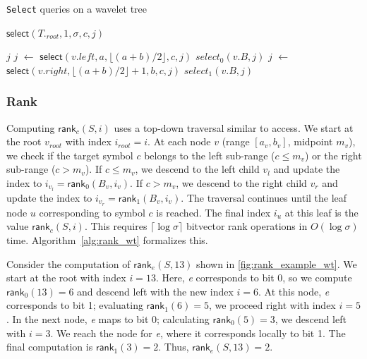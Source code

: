 \begin{algorithm}
    \caption{\texttt{Select} queries on a wavelet tree}\label{alg:select_wt}
    \small
    \begin{algorithmic}
        \State \Return $\textsf{select}(T._{root},1, \sigma, c, j)$
        \EndFunction


        \State \Return $j$
        \EndIf
        \State $j$ $\gets$ $\textsf{select}(v.left, a, \lfloor (a+b)/2 \rfloor, c, j)$
        \Return $select_0(v.B,j)$
        \Else
        \State $j$ $\gets$ $\textsf{select}(v.right, \lfloor (a+b)/2 \rfloor +1, b, c, j)$
        \State \Return $select_1(v.B,j)$
        \EndIf
        \EndFunction
    \end{algorithmic}
\end{algorithm}

\subsubsection{Rank}
Computing $\textsf{rank}_c(S, i)$ uses a top-down traversal similar to \textsf{access}. We start at the root $v_{root}$ with index $i_{root} = i$. At each node $v$ (range $[a_v, b_v]$, midpoint $m_v$), we check if the target symbol $c$ belongs to the left sub-range ($c \le m_v$) or the right sub-range ($c > m_v$). If $c \le m_v$, we descend to the left child $v_l$ and update the index to $i_{v_l} = \textsf{rank}_0(B_v, i_v)$. If $c > m_v$, we descend to the right child $v_r$ and update the index to $i_{v_r} = \textsf{rank}_1(B_v, i_v)$. The traversal continues until the leaf node $u$ corresponding to symbol $c$ is reached. The final index $i_u$ at this leaf is the value $\textsf{rank}_c(S, i)$. This requires $\lceil \log \sigma \rceil$ bitvector \textsf{rank} operations in $O(\log \sigma)$ time. Algorithm~\ref{alg:rank_wt} formalizes this.

\begin{example}
    Consider the computation of $\textsf{rank}_e(S, 13)$ shown in \autoref{fig:rank_example_wt}. We start at the root with index $i=13$. Here, \emph{e} corresponds to bit 0, so we compute $\textsf{rank}_0(13) = 6$ and descend left with the new index $i=6$. At this node, \emph{e} corresponds to bit 1; evaluating $\textsf{rank}_1(6) = 5$, we proceed right with index $i=5$. In the next node, \emph{e} maps to bit 0; calculating $\textsf{rank}_0(5) = 3$, we descend left with $i=3$. We reach the node for \emph{e}, where it corresponds locally to bit 1. The final computation is $\textsf{rank}_1(3) = 2$. Thus, $\textsf{rank}_e(S, 13) = 2$.
\end{example}


